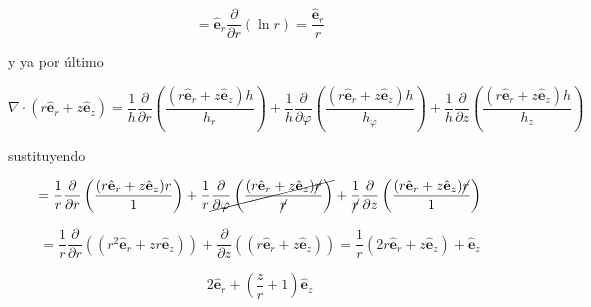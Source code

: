 \documentclass[12pt,a4paper]{article}
\begin{document}
\begin{enumerate}
     \begin{equation*}
         = \mathbf{\hat{e}}_r\frac{\partial}{\partial r} (\ln{r}) = \frac{\mathbf{\hat{e}}_r}{r}
     \end{equation*}
     
     y ya por último
     
     \begin{equation*}
         \nabla \cdot (r \hat{\mathbf{e}}_r + z \hat{\mathbf{e}}_z) = \frac{1}{h} \frac{\partial}{\partial r} \left(\frac{(r \hat{\mathbf{e}}_r + z \hat{\mathbf{e}}_z) h}{h_r}\right) + \frac{1}{h} \frac{\partial}{\partial \varphi} \left(\frac{(r \hat{\mathbf{e}}_r + z \hat{\mathbf{e}}_z) h}{h_\varphi}\right) + \frac{1}{h} \frac{\partial}{\partial z} \left(\frac{(r \hat{\mathbf{e}}_r + z \hat{\mathbf{e}}_z) h}{h_z}\right) 
     \end{equation*}
     
     sustituyendo
     
     \begin{equation*}
         = \frac{1}{r} \frac{\partial}{\partial r} \left(\frac{(r \hat{\mathbf{e}}_r + z \hat{\mathbf{e}}_z) r}{1}\right) + \frac{1}{r} \cancel{\frac{\partial}{\partial \varphi} \left(\frac{(r \hat{\mathbf{e}}_r + z \hat{\mathbf{e}}_z) \cancel{r}}{\cancel{r}}\right)} + \frac{1}{\cancel{r}} \frac{\partial}{\partial z} \left(\frac{(r \hat{\mathbf{e}}_r + z \hat{\mathbf{e}}_z) \cancel{r}}{1}\right)
     \end{equation*}
     
     \begin{equation*}
         = \frac{1}{r} \frac{\partial}{\partial r} \left((r^2 \hat{\mathbf{e}}_r + zr \hat{\mathbf{e}}_z)\right) +  \frac{\partial}{\partial z} \left((r \hat{\mathbf{e}}_r + z \hat{\mathbf{e}}_z)\right) = \frac{1}{r} (2r\mathbf{\hat{e}}_r + z \mathbf{\hat{e}}_z) + \mathbf{\hat{e}}_z  
     \end{equation*}
     
     \begin{equation*}
         2\mathbf{\hat{e}}_r + (\frac{z}{r} + 1) \mathbf{\hat{e}}_z
     \end{equation*}
     
     
     
     \begin{equation*}
     \end{equation*}
     
     
     
     




\end{enumerate}
\end{document}
